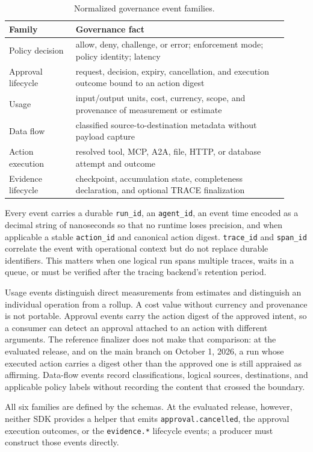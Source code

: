 \documentclass[10pt,letterpaper]{article}
\begin{document}
\begin{table}[h]
\centering
\begin{tabular}{p{0.22\linewidth}p{0.70\linewidth}}
\toprule
Family & Governance fact \\
\midrule
Policy decision & allow, deny, challenge, or error; enforcement mode; policy identity; latency \\
Approval lifecycle & request, decision, expiry, cancellation, and execution outcome bound to an action digest \\
Usage & input/output units, cost, currency, scope, and provenance of measurement or estimate \\
Data flow & classified source-to-destination metadata without payload capture \\
Action execution & resolved tool, MCP, A2A, file, HTTP, or database attempt and outcome \\
Evidence lifecycle & checkpoint, accumulation state, completeness declaration, and optional TRACE finalization \\
\bottomrule
\end{tabular}
\caption{Normalized governance event families.}
\end{table}

Every event carries a durable \texttt{run\_id}, an \texttt{agent\_id}, an event time encoded as a decimal string of nanoseconds so that no runtime loses precision, and when applicable a stable \texttt{action\_id} and canonical action digest. \texttt{trace\_id} and \texttt{span\_id} correlate the event with operational context but do not replace durable identifiers. This matters when one logical run spans multiple traces, waits in a queue, or must be verified after the tracing backend's retention period.

Usage events distinguish direct measurements from estimates and distinguish an individual operation from a rollup. A cost value without currency and provenance is not portable. Approval events carry the action digest of the approved intent, so a consumer can detect an approval attached to an action with different arguments. The reference finalizer does not make that comparison: at the evaluated release, and on the main branch on October 1, 2026, a run whose executed action carries a digest other than the approved one is still appraised as affirming. Data-flow events record classifications, logical sources, destinations, and applicable policy labels without recording the content that crossed the boundary.

All six families are defined by the schemas. At the evaluated release, however, neither SDK provides a helper that emits \texttt{approval.cancelled}, the approval execution outcomes, or the \texttt{evidence.*} lifecycle events; a producer must construct those events directly.
\end{document}
